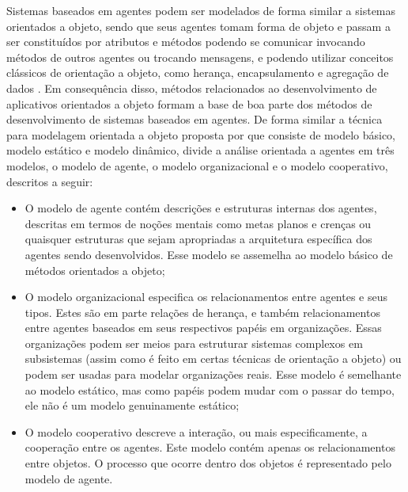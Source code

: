 Sistemas baseados em agentes podem ser modelados de forma similar a sistemas orientados a objeto, sendo que seus agentes tomam forma de objeto e passam a ser constituídos por atributos e métodos podendo se comunicar invocando métodos de outros agentes ou trocando mensagens, e podendo utilizar conceitos clássicos de orientação a objeto, como herança, encapsulamento e agregação de dados \cite{intelligent}. Em consequência disso, métodos relacionados ao desenvolvimento de aplicativos orientados a objeto formam a base de boa parte dos métodos de desenvolvimento de sistemas baseados em agentes. De forma similar a técnica para modelagem orientada a objeto proposta por  que consiste de modelo básico, modelo estático e modelo dinâmico,  divide a análise orientada a agentes em três modelos, o modelo de agente, o modelo organizacional e o modelo cooperativo, descritos a seguir:

\begin{itemize}
  \item O modelo de agente contém descrições e estruturas internas dos agentes, descritas em termos de noções mentais como metas planos e crenças ou quaisquer estruturas que sejam apropriadas a arquitetura específica dos agentes sendo desenvolvidos. Esse modelo se assemelha ao modelo básico de métodos orientados a objeto;
  \item O modelo organizacional especifica os relacionamentos entre agentes e seus tipos. Estes são em parte relações de herança, e também relacionamentos entre agentes baseados em seus respectivos papéis em organizações. Essas organizações podem ser meios para estruturar sistemas complexos em subsistemas (assim como é feito em certas técnicas de orientação a objeto) ou podem ser usadas para modelar organizações reais. Esse modelo é semelhante ao modelo estático, mas como papéis podem mudar com o passar do tempo, ele não é um modelo genuinamente estático;
  \item O modelo cooperativo descreve a interação, ou mais especificamente, a cooperação entre os agentes. Este modelo contém apenas os  relacionamentos entre objetos. O processo que ocorre dentro dos objetos é representado pelo modelo de agente.
\end{itemize}
